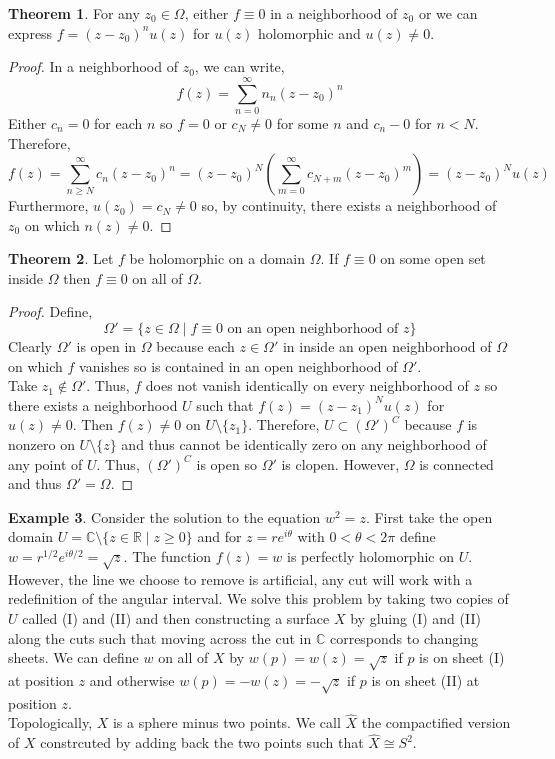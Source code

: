 \documentclass[12pt]{extarticle}
\newcommand{\R}{\mathbb{R}}
\newcommand{\C}{\mathbb{C}}
\theoremstyle{definition}
\newtheorem{theorem}{Theorem}[section]
\newtheorem{example}[theorem]{Example}
\begin{document}
\begin{theorem}
For any $z_0 \in \Omega$, either $f \equiv 0$ in a neighborhood of $z_0$ or we can express $f = (z - z_0)^n u(z)$ for $u(z)$ holomorphic and $u(z) \neq 0$.
\end{theorem}

\begin{proof}
In a neighborhood of $z_0$, we can write,
\[ f(z) = \sum_{n = 0}^\infty n_n(z - z_0)^n\]
Either $c_n = 0$ for each $n$ so $f = 0$ or $c_N \neq 0$ for some $n$ and $c_n - 0$ for $n < N$. Therefore,
\[ f(z) = \sum_{n \ge N}^\infty c_n(z - z_0)^n = (z - z_0)^N \left( \sum_{m = 0}^\infty c_{N + m} (z - z_0)^m \right) = (z - z_0)^N u(z) \]
Furthermore, $u(z_0) = c_N \neq 0$ so, by continuity, there exists a neighborhood of $z_0$ on which $n(z) \neq 0$.  
\end{proof}


\begin{theorem}
Let $f$ be holomorphic on a domain $\Omega$. If $f \equiv 0$ on some open set inside $\Omega$ then $f \equiv 0$ on all of $\Omega$. 
\end{theorem}

\begin{proof}
Define,
\[ \Omega' = \{ z \in \Omega \mid f \equiv 0 \text{ on an open neighborhood of } z \} \]
Clearly $\Omega'$ is open in $\Omega$ because each $z \in \Omega'$ in inside an open neighborhood of $\Omega$ on which $f$ vanishes so is contained in an open neighborhood of $\Omega'$.
\\
Take $z_1 \notin \Omega'$. Thus, $f$ does not vanish identically on every neighborhood of $z$ so there exists a neighborhood $U$ such that $f(z) = (z - z_1)^N u(z)$ for $u(z) \neq 0$. Then $f(z) \neq 0$ on $U \setminus \{z_1\}$. Therefore, $U \subset (\Omega')^C$ because $f$ is nonzero on $U \setminus \{z\}$ and thus cannot be identically zero on any neighborhood of any point of $U$. Thus, $(\Omega')^C$ is open so $\Omega'$ is clopen. However, $\Omega$ is connected and thus $\Omega' = \Omega$.  
\end{proof}


\begin{example}
Consider the solution to the equation $w^2 = z$. First take the open domain $U = \C \setminus \{ z \in \R \mid z \ge 0 \}$ and for $z = r e^{i \theta}$ with $0 < \theta < 2 \pi$ define $w = r^{1/2} e^{i \theta / 2} = \sqrt{z}$. The function $f(z) = w$ is perfectly holomorphic on $U$. However, the line we choose to remove is artificial, any cut will work with a redefinition of the angular interval. We solve this problem by taking two copies of $U$ called (I) and (II) and then constructing a surface $X$ by gluing (I) and (II) along the cuts such that moving across the cut in $\C$ corresponds to changing sheets. We can define $w$ on all of $X$ by $w(p) = w(z) = \sqrt{z}$ if $p$ is on sheet (I) at position $z$ and otherwise $w(p) = - w(z) = - \sqrt{z}$ if $p$ is on sheet (II) at position $z$.  
\bigskip\\
Topologically, $X$ is a sphere minus two points. We call $\hat{X}$ the compactified version of $X$ constrcuted by adding back the two points such that $\hat{X} \cong S^2$. 
\end{example}
\end{document}
